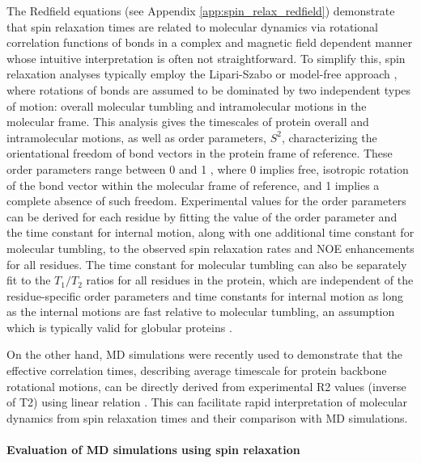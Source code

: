 \documentclass[9pt,review]{livecoms}
\begin{document}
The Redfield equations \cite{redfield_theory_1965} (see Appendix \ref{app:spin_relax_redfield}) demonstrate that spin relaxation times are related to molecular dynamics via rotational correlation functions of bonds in a complex and magnetic field dependent manner whose intuitive interpretation is often not straightforward.
To simplify this,  spin relaxation analyses \cite{best_determination_2004,showalter_toward_2007,showalter_validation_2007,maragakis_microsecond_2008,trbovic_structural_2008} typically employ the Lipari-Szabo or model-free approach \cite{halle1981interpretation,lipari_model-free_1982}, where rotations of bonds are assumed to be dominated by two independent types of motion: overall molecular tumbling and intramolecular motions in the molecular frame.
This analysis gives the timescales of protein overall and intramolecular motions, as well as order parameters, $S^2$, characterizing the orientational freedom of bond vectors in the protein frame of reference.
These order parameters range between 0 and 1 \cite{lipari_model-free_1982}, where 0 implies free, isotropic rotation of the bond vector within the molecular frame of reference, and 1 implies a complete absence of such freedom.
Experimental values for the order parameters can be derived for each residue by fitting the value of the order parameter and the time constant for internal motion, along with one additional time constant for molecular tumbling, to the observed spin relaxation rates and NOE enhancements for all residues.
The time constant for molecular tumbling can also be separately fit to the $T_1/T_2$ ratios for all residues in the protein, which are independent of the residue-specific order parameters and time constants for internal motion as long as the internal motions are fast relative to molecular tumbling, an assumption which is typically valid for globular proteins \cite{virtanen_heterogeneous_2020}.

On the other hand, MD simulations were recently used to demonstrate that the effective correlation times, describing average timescale for protein backbone rotational motions, can be directly derived from experimental R2 values (inverse of T2) using linear relation \cite{nencini_rapid_2024}.
This can facilitate rapid interpretation of molecular dynamics from spin relaxation times and their comparison with MD simulations.

\paragraph{Evaluation of MD simulations using spin relaxation}
\end{document}
